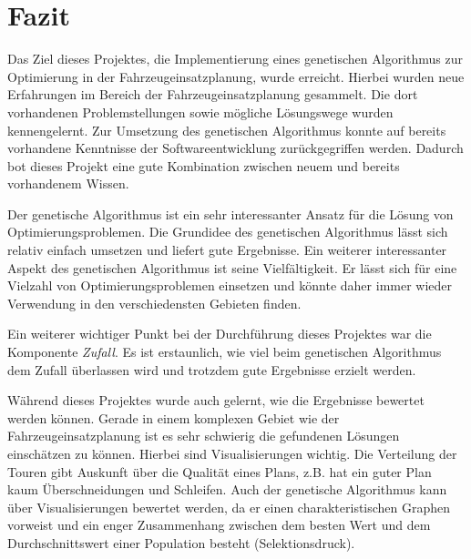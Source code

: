 \section{Fazit}
Das Ziel dieses Projektes, die Implementierung eines genetischen Algorithmus zur Optimierung in der Fahrzeugeinsatzplanung, wurde erreicht. Hierbei wurden neue Erfahrungen im Bereich der Fahrzeugeinsatzplanung gesammelt. Die dort vorhandenen Problemstellungen sowie mögliche Lösungswege wurden kennengelernt. Zur Umsetzung des genetischen Algorithmus konnte auf bereits vorhandene Kenntnisse der Softwareentwicklung zurückgegriffen werden. Dadurch bot dieses Projekt eine gute Kombination zwischen neuem und bereits vorhandenem Wissen.

Der genetische Algorithmus ist ein sehr interessanter Ansatz für die Lösung von Optimierungsproblemen. Die Grundidee des genetischen Algorithmus lässt sich relativ einfach umsetzen und liefert gute Ergebnisse. Ein weiterer interessanter Aspekt des genetischen Algorithmus ist seine Vielfältigkeit. Er lässt sich für eine Vielzahl von Optimierungsproblemen einsetzen und könnte daher immer wieder Verwendung in den verschiedensten Gebieten finden.

Ein weiterer wichtiger Punkt bei der Durchführung dieses Projektes war die Komponente \textit{Zufall}. Es ist erstaunlich, wie viel beim genetischen Algorithmus dem Zufall überlassen wird und trotzdem gute Ergebnisse erzielt werden. 

Während dieses Projektes wurde auch gelernt, wie die Ergebnisse bewertet werden können. Gerade in einem komplexen Gebiet wie der Fahrzeugeinsatzplanung ist es sehr schwierig die gefundenen Lösungen einschätzen zu können. Hierbei sind Visualisierungen wichtig. Die Verteilung der Touren gibt Auskunft über die Qualität eines Plans, z.B. hat ein guter Plan kaum Überschneidungen und Schleifen. Auch der genetische Algorithmus kann über Visualisierungen bewertet werden, da er einen charakteristischen Graphen vorweist und ein enger Zusammenhang zwischen dem besten Wert und dem Durchschnittswert einer Population besteht (Selektionsdruck).
